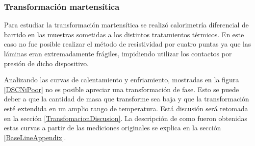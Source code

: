 \documentclass[12pt]{article}
\theoremstyle{definition}
\theoremstyle{remark}
\begin{document}
{\subsubsection{Transformación martensítica}

Para estudiar la transformación martensítica se realizó calorimetría diferencial de barrido en las muestras sometidas a los distintos tratamientos térmicos. En este caso no fue posible realizar el método de resistividad por cuatro puntas ya que las láminas eran extremadamente frágiles, impidiendo utilizar los contactos por presión de dicho dispositivo.

Analizando las curvas de calentamiento y enfriamiento, mostradas en la figura \ref{DSCNiPoor} no es posible apreciar una transformación de fase. Esto se puede deber a que la cantidad de masa que transforme sea baja y que la transformación esté extendida en un amplio rango de temperatura. Está discusión será retomada en la sección \ref{TransfomacionDiscusion}. La descripción de como fueron obtenidas estas curvas a partir de las mediciones originales se explica en la sección \ref{BaseLineAppendix}.

}
\end{document}

